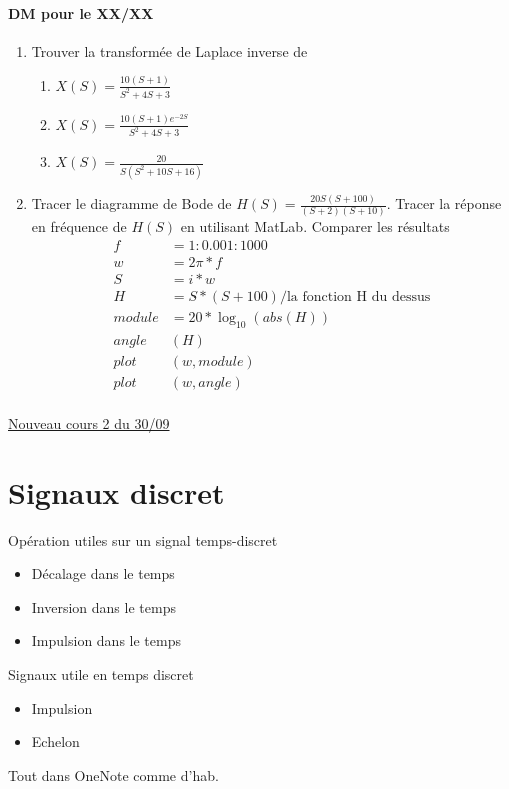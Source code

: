 \documentclass{article}
\theoremstyle{plain}%
\theoremstyle{definition}
\theoremstyle{remark}
\begin{document}
\paragraph*{DM pour le XX/XX}
\begin{enumerate}
    \item Trouver la transformée de Laplace inverse de \begin{enumerate}
        \item $ X(S) = \frac{10 (S+1)}{S^2 + 4S + 3} $ 
        \item $ X(S) = \frac{10 (S+1)e^{-2S}}{S^2 + 4S + 3} $ 
        \item $ X(S) = \frac{20}{S(S^2 + 10S + 16)} $ 
    \end{enumerate} 
    \item Tracer le diagramme de Bode de $ H(S) = \frac{20S(S+100)}{(S+2)(S+10)} $. Tracer la réponse en fréquence de $ H(S) $ en utilisant MatLab. Comparer les résultats \begin{align*}
        f&=1:0.001:1000\\
        w&=2 \pi * f \\
        S&=i*w \\
        H&=S \dot{} * (S+100) / \text{la fonction H du dessus} \\
        module &= 20 * \log_{10} (abs(H)) \\
        angle&(H) \\
        plot&(w, module) \\
        plot&(w, angle) \\
    \end{align*}
\end{enumerate}

\underline{Nouveau cours 2 du 30/09} \\

\section{Signaux discret}

Opération utiles sur un signal temps-discret
\begin{itemize}
    \item Décalage dans le temps 
    \item Inversion dans le temps
    \item Impulsion dans le temps
\end{itemize}
Signaux utile en temps discret
\begin{itemize}
    \item Impulsion
    \item Echelon
\end{itemize}
Tout dans OneNote comme d'hab.
\end{document}
